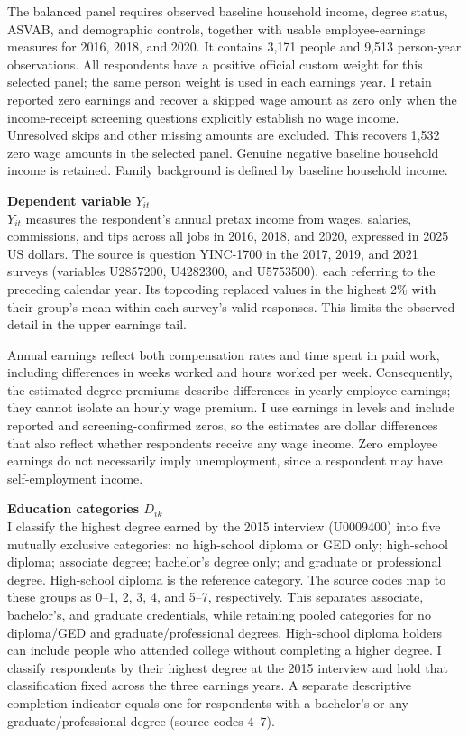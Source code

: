 \documentclass[12pt,letterpaper]{article}
\begin{document}
The balanced panel requires observed baseline household income, degree status,
ASVAB, and demographic controls, together with usable employee-earnings measures
for 2016, 2018, and 2020. It contains 3,171 people and 9,513 person-year observations.
All respondents have a positive official custom weight for this selected panel;
the same person weight is used in each earnings year. I retain reported zero earnings and
recover a skipped wage amount as zero only when the income-receipt screening
questions explicitly establish no wage income. Unresolved skips and other missing
amounts are excluded. This recovers 1,532 zero wage amounts in the selected panel.
Genuine negative baseline household income is retained. Family background is
defined by baseline household income.\newline

\textbf{Dependent variable $Y_{it}$}\\
$Y_{it}$ measures the respondent's annual pretax income from wages, salaries,
commissions, and tips across all jobs in 2016, 2018, and 2020, expressed in 2025
US dollars. The source is question YINC-1700 in the 2017, 2019, and 2021 surveys
(variables U2857200, U4282300, and U5753500), each referring to the preceding
calendar year. Its topcoding replaced values in the highest 2\% with 
their group's mean within each survey's valid responses. This limits the
 observed detail in the upper earnings tail.\newline

Annual earnings reflect both compensation rates and time spent in paid work,
including differences in weeks worked and hours worked per week. Consequently,
the estimated degree premiums describe differences in yearly employee earnings;
they cannot isolate an hourly wage premium. I use earnings in levels and include
reported and screening-confirmed zeros, so the estimates are dollar differences
that also reflect whether respondents receive any wage income. Zero employee earnings
do not necessarily imply unemployment, since a respondent may have self-employment
income.\newline

\textbf{Education categories $D_{ik}$}\\
I classify the highest degree earned by the 2015 interview (U0009400) into five mutually exclusive
categories: no high-school diploma or GED only; high-school diploma; associate
degree; bachelor's degree only; and graduate or professional degree. High-school
diploma is the reference category. The source codes map to these groups as
0--1, 2, 3, 4, and 5--7, respectively. This separates associate, bachelor's, and
graduate credentials, while retaining pooled categories for no diploma/GED and
graduate/professional degrees. High-school diploma holders can include people who
attended college without completing a higher degree. I classify respondents by their
highest degree at the 2015 interview and hold that classification fixed across the
three earnings years. A separate descriptive completion indicator
equals one for respondents with a bachelor's or any graduate/professional degree (source codes 4--7).\newline
\end{document}

